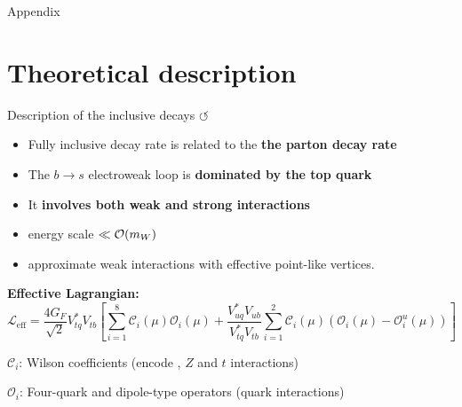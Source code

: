 \documentclass[xcolor=dvipsnames]{beamer}
\begin{document}
\begin{frame}{\hypertarget{frame:A}{Appendix}}

   \centering\scriptsize

   \tableofcontents

\end{frame}

\section{Theoretical description}

\begin{frame}{Description of the inclusive decays \hyperlink{frame:A}{$\circlearrowleft$}}
   \scriptsize

   \begin{itemize}
      \item Fully inclusive decay rate is related to the \textbf{the parton decay rate}
      \item The $b\to s$ electroweak loop is \textbf{dominated by the top quark} 
      \item It \textbf{involves both weak and strong interactions}
      \item[\ra] energy scale $\ll{\ensuremath{\cal O}}(m_W)$
      \item[\ra] approximate weak interactions with effective point-like vertices.
   \end{itemize}

   \textbf{Effective Lagrangian:}
   \begin{equation}\nonumber
      \mathcal{L}_{\mathrm{eff}} = \frac{4G_F}{\sqrt{2}}V_{tq}^*V_{tb}\left[\sum^{8}_{i=1}\mathcal{C}_i(\mu)\mathcal{O}_i(\mu)
                                                  + \frac{V^*_{uq}V_{ub}}{V^*_{tq}V_{tb}}\sum^{2}_{i=1}\mathcal{C}_i(\mu)(\mathcal{O}_i(\mu)-\mathcal{O}_i^u(\mu))\right]
  \end{equation}

  \vspace{10pt}

  $\mathcal{C}_i$: Wilson coefficients (encode \Wpm, $Z$ and $t$ interactions)
  
  $\mathcal{O}_i$: Four-quark and dipole-type operators (quark interactions)

\end{frame}
\end{document}

